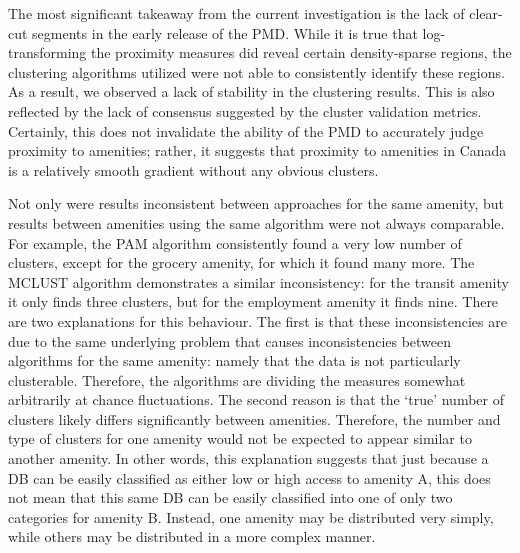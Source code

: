 \documentclass[11pt, a4paper]{article}
\begin{document}
The most significant takeaway from the current investigation is the lack of clear-cut segments in the early release of the PMD. While it is true that log-transforming the proximity measures did reveal certain density-sparse regions, the clustering algorithms utilized were not able to consistently identify these regions. As a result, we observed a lack of stability in the clustering results. This is also reflected by the lack of consensus suggested by the cluster validation metrics. Certainly, this does not invalidate the ability of the PMD to accurately judge proximity to amenities; rather, it suggests that proximity to amenities in Canada is a relatively smooth gradient without any obvious clusters.
\par
Not only were results inconsistent between approaches for the same amenity, but results between amenities using the same algorithm were not always comparable. For example, the PAM algorithm consistently found a very low number of clusters, except for the grocery amenity, for which it found many more. The MCLUST algorithm demonstrates a similar inconsistency: for the transit amenity it only finds three clusters, but for the employment amenity it finds nine. There are two explanations for this behaviour. The first is that these inconsistencies are due to the same underlying problem that causes inconsistencies between algorithms for the same amenity: namely that the data is not particularly clusterable. Therefore, the algorithms are dividing the measures somewhat arbitrarily at chance fluctuations. The second reason is that the `true' number of clusters likely differs significantly between amenities. Therefore, the number and type of clusters for one amenity would not be expected to appear similar to another amenity. In other words, this explanation suggests that just because a DB can be easily classified as either low or high access to amenity A, this does not mean that this same DB can be easily classified into one of only two categories for amenity B. Instead, one amenity may be distributed very simply, while others may be distributed in a more complex manner.
\par
\end{document}
